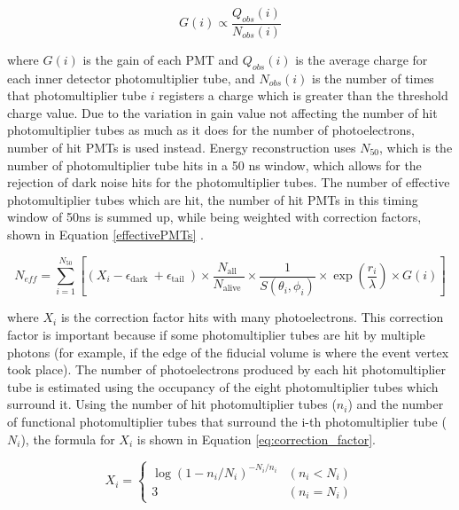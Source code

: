 \begin{equation}
    G(i) \propto \frac{Q_{o b s}(i)}{N_{o b s}(i)}
\label{gain_equation}
\end{equation}

where $G(i)$ is the gain of each PMT and $Q_{obs}(i)$ is the average charge for each inner detector photomultiplier tube, and $N_{obs}(i)$ is the number of times that photomultiplier tube $i$ registers a charge which is greater than the threshold charge value. Due to the variation in gain value not affecting the number of hit photomultiplier tubes as much as it does for the number of photoelectrons, number of hit PMTs is used instead. Energy reconstruction uses $N_{50}$, which is the number of photomultiplier tube hits in a 50 ns window, which allows for the rejection of dark noise hits for the photomultiplier tubes. The number of effective photomultiplier tubes which are hit, the number of hit PMTs in this timing window of 50ns is summed up, while being weighted with correction factors, shown in Equation \ref{effectivePMTs} \cite{uenoAnalysisNuclearDeexcitation}. 

\begin{equation}
    N_{e f f}=\sum_{i=1}^{N_{50}}\left[\left(X_{i}-\epsilon_{\text {dark }}+\epsilon_{\text {tail }}\right) \times \frac{N_{\text {all }}}{N_{\text {alive }}} \times \frac{1}{S\left(\theta_{i}, \phi_{i}\right)} \times \exp \left(\frac{r_{i}}{\lambda}\right) \times G(i)\right]
    \label{effectivePMTs}
\end{equation}

where $X_{i}$ is the correction factor hits with many photoelectrons. This correction factor is important because if some photomultiplier tubes are hit by multiple photons (for example, if the edge of the fiducial volume is where the event vertex took place). The number of photoelectrons produced by each hit photomultiplier tube is estimated using the occupancy of the eight photomultiplier tubes which surround it. Using the number of hit photomultiplier tubes ($n_{i}$) and the number of functional photomultiplier tubes that surround the i-th photomultiplier tube ($N_{i}$), the formula for $X_{i}$ is shown in Equation \ref{eq:correction_factor}.

\begin{equation}
    X_{i}=\left\{\begin{array}{ll}
    \log \left(1-n_{i} / N_{i}\right)^{-N_{i} / n_{i}} & \left(n_{i}<N_{i}\right) \\
    3 & \left(n_{i}=N_{i}\right)
    \end{array}\right.
    \label{eq:correction_factor}
\end{equation}


